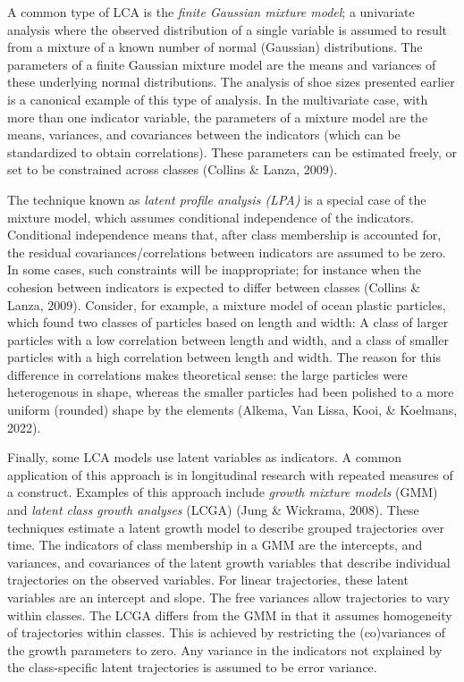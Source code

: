 \documentclass[
  ,man,floatsintext]{apa6}
\begin{document}
A common type of LCA is the \emph{finite Gaussian mixture model}; a
univariate analysis where the observed distribution of a single variable
is assumed to result from a mixture of a known number of normal
(Gaussian) distributions. The parameters of a finite Gaussian mixture
model are the means and variances of these underlying normal
distributions. The analysis of shoe sizes presented earlier is a
canonical example of this type of analysis. In the multivariate case,
with more than one indicator variable, the parameters of a mixture model
are the means, variances, and covariances between the indicators (which
can be standardized to obtain correlations). These parameters can be estimated
freely, or set to be constrained across classes (Collins \& Lanza, 2009).

The technique known as \emph{latent profile analysis (LPA)} is a special case
of the mixture model, which assumes conditional independence of the
indicators. Conditional independence means that, after class membership
is accounted for,
the residual covariances/correlations between indicators are
assumed to be zero.
In some cases, such constraints
will be inappropriate; for instance when the cohesion between indicators
is expected to differ between classes (Collins \& Lanza, 2009).
Consider, for example, a mixture model of ocean plastic particles, which found two classes of particles based on length and width:
A class of larger particles with a low correlation between length and width,
and a class of smaller particles with a high correlation between length and width.
The reason for this difference in correlations makes theoretical sense:
the large particles were heterogenous in shape,
whereas the smaller particles had been polished to a more uniform (rounded) shape by the elements (Alkema, Van Lissa, Kooi, \& Koelmans, 2022).

Finally, some LCA models use latent variables as indicators.
A common application of this approach is in
longitudinal research with repeated measures of a construct.
Examples of this approach include
\emph{growth mixture models} (GMM) and \emph{latent class growth analyses} (LCGA)
(Jung \& Wickrama, 2008).
These techniques estimate a latent growth model
to describe grouped trajectories over time.
The indicators of class membership in a GMM are the
intercepts, and variances, and covariances of the latent growth variables that describe individual trajectories on the observed variables.
For linear trajectories, these latent variables are an intercept and slope.
The free variances allow trajectories to vary within classes. The LCGA differs from the GMM in that it assumes homogeneity of trajectories within classes.
This is achieved by restricting the (co)variances of the growth parameters to zero.
Any variance in the indicators not explained by the class-specific
latent trajectories is assumed to be error variance.
\end{document}
